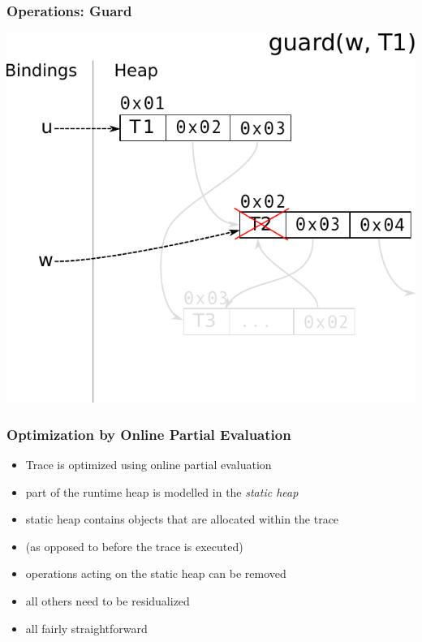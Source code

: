 \documentclass[utf8x]{beamer}
\begin{document}
\begin{frame}[plain]
  \frametitle{Operations: Guard}
  \includegraphics[scale=0.8]{figures/guard04}
\end{frame}

\begin{frame}
  \frametitle{Optimization by Online Partial Evaluation}
  \begin{itemize}
      \item Trace is optimized using online partial evaluation
      \item part of the runtime heap is modelled in the \emph{static heap}
      \item static heap contains objects that are allocated within the trace
      \item (as opposed to before the trace is executed)
      \pause
      \item operations acting on the static heap can be removed
      \item all others need to be residualized
      \item all fairly straightforward
  \end{itemize}
\end{frame}
\end{document}
